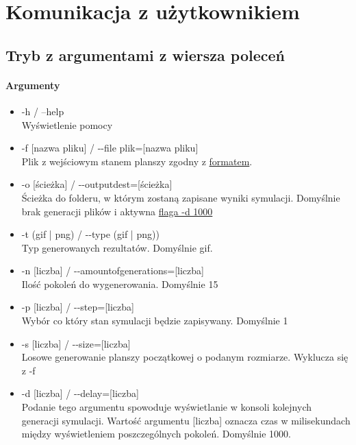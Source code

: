 \documentclass{report}
\begin{document}
\section{Komunikacja z użytkownikiem}

\subsection{Tryb z argumentami z wiersza poleceń}
\paragraph{Argumenty}
\begin{itemize}
\item -h / --help \\ Wyświetlenie pomocy
\item -f [nazwa pliku]  / -{}-file plik=[nazwa pliku] \\ Plik z wejściowym stanem planszy zgodny z \hyperref[format]{\textcolor{LinkColor}{formatem}}. %
\item -o [ścieżka] / -{}-output\textunderscore{}dest=[ścieżka]  \\Ścieżka do folderu, w którym zostaną zapisane wyniki symulacji. Domyślnie brak generacji plików i aktywna \hyperref[delay]{\textcolor{LinkColor}{flaga -d 1000}}
\item -t (gif | png) / -{}-type (gif | png)) \\Typ generowanych rezultatów. Domyślnie gif.
\item -n [liczba] / -{}-amount\textunderscore{}of\textunderscore{}generations=[liczba] \\ Ilość pokoleń do wygenerowania. Domyślnie 15
\item -p [liczba] / -{}-step=[liczba] \\ Wybór co który stan symulacji będzie zapisywany. Domyślnie 1
\item -s [liczba] / -{}-size=[liczba] \\ Losowe generowanie planszy początkowej o podanym rozmiarze. Wyklucza się z -f
\item \label{delay} -d [liczba] / -{}-delay=[liczba] \\ Podanie tego argumentu spowoduje wyświetlanie w konsoli kolejnych generacji symulacji. Wartość argumentu [liczba] oznacza czas  w milisekundach między wyświetleniem poszczególnych pokoleń. Domyślnie 1000.
\end{itemize}
\end{document}
